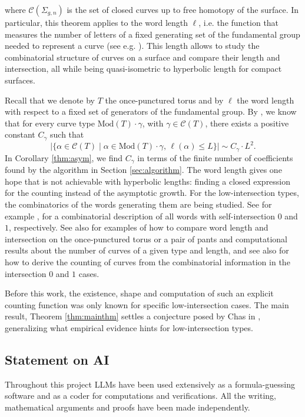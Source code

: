\documentclass{article}
\begin{document}
	where $\mathcal{C}(\Sigma_{g,n})$ is the set of closed curves up to free homotopy of the surface. In particular, this theorem applies to the word length $\ell$, i.e. the function that measures the number of letters of a fixed generating set of the fundamental group needed to represent a curve (see e.g. \cite{Erlandsson}). This length allows to study the combinatorial structure of curves on a surface and compare their length and intersection, all while being quasi-isometric to hyperbolic length for compact surfaces. 
	
	Recall that we denote by $T$ the once-punctured torus and by $\ell$ the word length with respect to a fixed set of generators of the fundamental group. By \cite{ErlandssonParlierSouto20}, we know that for every curve type $\mathrm{Mod}(T)\cdot \gamma$, with $\gamma\in\mathcal{C}(T)$, there exists a positive constant $C_\gamma$ such that 
	\[
	| \{ \alpha \in \mathcal{C}(T) \mid \alpha \in\mathrm{Mod}(T)\cdot \gamma , \, \ell(\alpha) \leq L \}|
	\sim
	C_{\gamma}  \cdot L^{2}.
	\]
	In Corollary \ref{thm:asym}, we find $C_\gamma$ in terms of the finite number of coefficients found by the algorithm in Section \ref{sec:algorithm}.
	The word length gives one hope that is not achievable with hyperbolic lengths: finding a closed expression for the counting instead of the asymptotic growth. For the low-intersection types, the combinatorics of the words generating them are being studied. See for example \cite{BuserSemmler,FisacLiu}, for a combinatorial description of all words with self-intersection $0$ and $1$, respectively. See also \cite{CP10,Cha15,CML12,CL12,Chas} for examples of how to compare word length and intersection on the once-punctured torus or a pair of pants and computational results about the number of curves of a given type and length, and see also \cite{FisacLiu} for how to derive the counting of curves from the combinatorial information in the intersection $0$ and $1$ cases.
	
	Before this work, the existence, shape and computation of such an explicit counting function was only known for specific low-intersection cases. The main result, Theorem \ref{thm:mainthm} settles a conjecture posed by Chas in \cite{Chas}, generalizing what empirical evidence hints for low-intersection types.
	
	\subsection*{Statement on AI}
	Throughout this project LLMs have been used extensively as a formula-guessing software and as a coder for computations and verifications. All the writing, mathematical arguments and proofs have been made independently.
	
\end{document}
